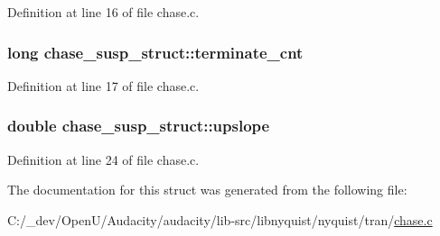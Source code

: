 Definition at line 16 of file chase.\+c.

\subsubsection[{\texorpdfstring{terminate\+\_\+cnt}{terminate_cnt}}]{\setlength{\rightskip}{0pt plus 5cm}long chase\+\_\+susp\+\_\+struct\+::terminate\+\_\+cnt}\hypertarget{structchase__susp__struct_a2d76ff8d509df268cc204800ed5e5e63}{}\label{structchase__susp__struct_a2d76ff8d509df268cc204800ed5e5e63}


Definition at line 17 of file chase.\+c.

\subsubsection[{\texorpdfstring{upslope}{upslope}}]{\setlength{\rightskip}{0pt plus 5cm}double chase\+\_\+susp\+\_\+struct\+::upslope}\hypertarget{structchase__susp__struct_aca2af28755fbd7043cdbb3a3dec4b67b}{}\label{structchase__susp__struct_aca2af28755fbd7043cdbb3a3dec4b67b}


Definition at line 24 of file chase.\+c.



The documentation for this struct was generated from the following file\+:\begin{DoxyCompactItemize}
\item 
C\+:/\+\_\+dev/\+Open\+U/\+Audacity/audacity/lib-\/src/libnyquist/nyquist/tran/\hyperlink{chase_8c}{chase.\+c}\end{DoxyCompactItemize}
